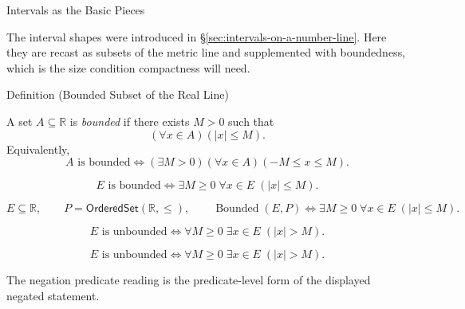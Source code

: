 \label{sec:intervals-as-subsets}

\begin{topicbox}{Intervals as the Basic Pieces}
\begin{exposition}
The interval shapes were introduced in \S\ref{sec:intervals-on-a-number-line}. Here they are recast as subsets of the metric line and supplemented with boundedness, which is the size condition compactness will need.
\end{exposition}
\end{topicbox}

\begin{definitionbox}{Definition (Bounded Subset of the Real Line)}
\begin{definition}
\label{def:bounded-subset-of-r}
A set $A\subseteq\mathbb{R}$ is \emph{bounded} if there exists $M>0$ such that
\[
  (\forall x\in A)(|x|\leq M).
\]
Equivalently,
\[
  A\text{ is bounded}
  \Longleftrightarrow
  (\exists M>0)(\forall x\in A)(-M\leq x\leq M).
\]
\end{definition}
\end{definitionbox}
\begin{remark*}
\[
E \text{ is bounded} \Longleftrightarrow \exists M\ge 0\;\forall x\in E\;(|x|\le M).
\]
\end{remark*}
\begin{remark*}
\[
E\subseteq\mathbb{R},\qquad P=\mathsf{OrderedSet}(\mathbb{R},\leq),\qquad
\operatorname{Bounded}(E,P)
\Longleftrightarrow
\exists M\ge 0\;\forall x\in E\;(|x|\le M).
\]
\end{remark*}
\begin{remark*}
\[
E \text{ is unbounded} \Longleftrightarrow \forall M\ge 0\;\exists x\in E\;(|x|>M).
\]
\end{remark*}

\begin{remark*}
\[
E \text{ is unbounded} \Longleftrightarrow \forall M\ge 0\;\exists x\in E\;(|x|>M).
\]

The negation predicate reading is the predicate-level form of the displayed negated statement.
\end{remark*}

